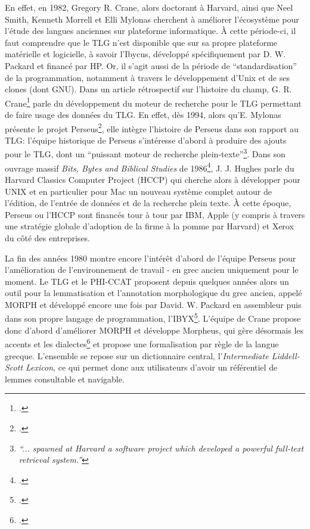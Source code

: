 En effet, en 1982, Gregory R. Crane, alors doctorant à Harvard, ainsi que Neel Smith, Kenneth Morrell et Elli Mylonas cherchent à améliorer l'écosystème pour l'étude des langues anciennes sur plateforme informatique. À cette période-ci, il faut comprendre que le TLG n'est disponible que sur sa propre plateforme matérielle et logicielle, à savoir l'Ibycus, développé spécifiquement par D. W. Packard et financé par HP. Or, il s'agit aussi de la période de \enquote{standardisation} de la programmation, notamment à travers le développement d'Unix et de ses clones (dont GNU). Dans un article rétrospectif sur l'histoire du champ, G. R. Crane\footcite{schreibman_classics_2004} parle du développement du moteur de recherche pour le TLG permettant de faire usage des données du TLG. En effet, dès 1994, alors qu'E. Mylonas présente le projet Perseus\footcite{mylonas_perseus_1993}, elle intègre l'histoire de Perseus dans son rapport au TLG: l'équipe historique de Perseus s'intéresse d'abord à produire des ajouts pour le TLG, dont un \enquote{puissant moteur de recherche plein-texte}\footnote{\textit{\enquote{... spawned at Harvard a software project which developed a powerful full-text retrieval system.}}}. Dans son ouvrage massif \textit{Bits, Bytes and Biblical Studies} de 1986\footcite[p. 598]{hughes_bits_1987}, J. J. Hughes parle du Harvard Classics Computer Project (HCCP) qui cherche alors à développer pour UNIX et en particulier pour Mac un nouveau système complet autour de l'édition, de l'entrée de données et de la recherche plein texte. À cette époque, Perseus ou l'HCCP sont financés tour à tour par IBM, Apple (y compris à travers une stratégie globale d'adoption de la firme à la pomme par Harvard) et Xerox du côté des entreprises.

La fin des années 1980 montre encore l'intérêt d'abord de l'équipe Perseus pour l'amélioration de l'environnement de travail - en grec ancien uniquement pour le moment. Le TLG et le PHI-CCAT proposent depuis quelques années alors un outil pour la lemmatisation et l'annotation morphologique du grec ancien, appelé MORPH et développé encore une fois par David. W. Packard en assembleur puis dans son propre langage de programmation, l'IBYX\footcite[p.554-555]{hughes_bits_1987}. L'équipe de Crane propose donc d'abord d'améliorer MORPH et développe Morpheus, qui gère désormais les accents et les dialectes\footcite{mylonas_perseus_1993} et propose une formalisation par règle de la langue grecque. L'ensemble se repose sur un dictionnaire central, l'\textit{Intermediate Liddell-Scott Lexicon}, ce qui permet donc aux utilisateurs d'avoir un référentiel de lemmes consultable et navigable.

